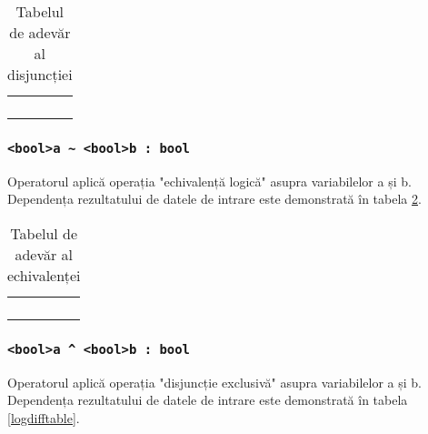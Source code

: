 \begin{table}[htb]
	\caption{Tabelul de adevăr al disjuncției}
	\label{distable}
	\begin{tabular}{|c|c|c|}
		\hline
		\code{a} & \code{b} & \code{a \| b} 	\\ \hline
		\false{} & \false{} & \false{} 		\\ \hline
		\false{} & \true{}  & \true{}  		\\ \hline
		\true{}  & \false{} & \true{}  		\\ \hline
		\true{}  & \true{}  & \true{}  		\\ \hline
	\end{tabular}
	\vspace{-2em}
\end{table}

\subsubsection{\lstinline|<bool>a ~ <bool>b : bool|}

Operatorul aplică operația "echivalență logică" asupra variabilelor a și b. Dependența rezultatului de datele de intrare este demonstrată în tabela \ref{logeqtable}.

\begin{table}[htb]
	\caption{Tabelul de adevăr al echivalenței}
	\label{logeqtable}
	\begin{tabular}{|c|c|c|}
		\hline
		\code{a} & \code{b} & \code{a \~ b} \\ \hline
		\false{} & \false{} & \true{}   	\\ \hline
		\false{} & \true{}  & \false{}  	\\ \hline
		\true{}  & \false{} & \false{}  	\\ \hline
		\true{}  & \true{}  & \true{}   	\\ \hline
	\end{tabular}
	\vspace{0em}
\end{table}

\subsubsection{\lstinline|<bool>a ^ <bool>b : bool|}

Operatorul aplică operația "disjuncție exclusivă" asupra variabilelor a și b. Dependența rezultatului de datele de intrare este demonstrată în tabela \ref{logdifftable}.

